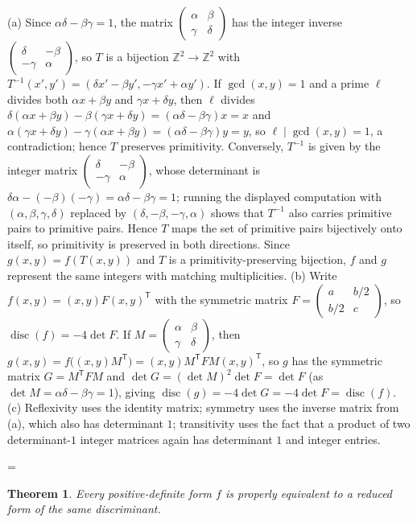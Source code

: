 \documentclass[11pt]{article}
\makeatletter
\theoremstyle{ntstyle}
\newtheorem{theorem}{Theorem}[subsection]
\let\nt@closedisplay\]
\def\nt@guardedclose{\@ifnextchar\par{\nt@closeafterpar}{\@ifnextchar\end{\postdisplaypenalty\@M\nt@closedisplay}{\nt@closedisplay}}}
\def\nt@closeafterpar\par{\@ifnextchar\par{\nt@closeafterpar}{\@ifnextchar\end{\postdisplaypenalty\@M\nt@closedisplay\par}{\nt@closedisplay\par}}}
\renewenvironment{proof}[1][\proofname]{\par
  \pushQED{\qed}\normalfont\topsep\medskipamount\edef\nt@afterproof{\@endparpenalty=\the\@endparpenalty\relax}\@beginparpenalty\@M\@endparpenalty\@M\let\]\nt@guardedclose\trivlist\item[]\textit{#1\@addpunct{.}} \ignorespaces}{\ifvmode\addpenalty\@M\fi\popQED\nt@afterproof\endtrivlist\@endpefalse}
\DeclareMathOperator{\disc}{disc}
\makeatother
\begin{document}
\begin{proof} (a) Since $\alpha\delta-\beta\gamma=1$, the
	matrix $
		\begin{pmatrix}\alpha & \beta \\\gamma&\delta
		\end{pmatrix}$ has the integer inverse $
		\begin{pmatrix}\delta & -\beta \\-\gamma&\alpha
		\end{pmatrix}$, so $T$ is a bijection
	$\mathbb{Z}^2\to\mathbb{Z}^2$ with
	$T^{-1}(x',y')=(\delta x'-\beta y',-\gamma x'+\alpha y')$. If $\gcd(x,
		y)=1$ and a prime $\ell$ divides both $\alpha x+\beta y$ and $\gamma
		x+\delta y$, then $\ell$ divides
	$\delta(\alpha x+\beta y)-\beta(\gamma x+\delta
		y)=(\alpha\delta-\beta\gamma)x=x$ and $\alpha(\gamma x+\delta
		y)-\gamma(\alpha x+\beta y)=(\alpha\delta-\beta\gamma)y=y$, so
	$\ell\mid\gcd(x, y)=1$, a contradiction; hence $T$ preserves
	primitivity. Conversely, $T^{-1}$ is given by the integer matrix
	$\begin{pmatrix}\delta&-\beta\\-\gamma&\alpha\end{pmatrix}$, whose
	determinant is
	$\delta\alpha-(-\beta)(-\gamma)=\alpha\delta-\beta\gamma=1$; running
	the displayed computation with
	$(\alpha,\beta,\gamma,\delta)$ replaced by
	$(\delta,-\beta,-\gamma,\alpha)$ shows that $T^{-1}$ also carries
	primitive pairs to primitive pairs. Hence $T$ maps the set of
	primitive pairs bijectively onto itself, so primitivity is preserved
	in both directions. Since
	$g(x,y)=f(T(x,y))$ and $T$ is a primitivity-preserving bijection, $f$
	and $g$ represent the same integers with matching multiplicities.
	(b) Write $f(x,y)=(x,y)F(x,y)^{\mathsf{T}}$ with the symmetric matrix $F=
		\begin{pmatrix}a & b/2 \\b/2&c
		\end{pmatrix}$, so $\disc(f)=-4\det F$. If $M=
		\begin{pmatrix}\alpha & \beta \\\gamma&\delta
		\end{pmatrix}$, then $g(x,y)=f\big((x,y)M^{\mathsf{T}}\big)=(x,y)M^{\mathsf{T}} F
		M(x,y)^{\mathsf{T}}$, so $g$ has the symmetric matrix $G=M^{\mathsf{T}}FM$ and $\det
		G=(\det M)^2\det F=\det F$ (as $\det
		M=\alpha\delta-\beta\gamma=1$), giving
	$\disc(g)=-4\det G=-4\det F=\disc(f)$.
	(c) Reflexivity uses the identity matrix; symmetry uses the inverse
	matrix from (a), which also has determinant $1$; transitivity uses
	the fact that a product of two determinant-$1$ integer matrices again has
	determinant $1$ and integer entries.

\end{proof}
\begin{theorem}\label{thm:8.6.2} Every positive-definite form $f$ is properly equivalent to a
	reduced form of the same discriminant.

\end{theorem}
\end{document}
